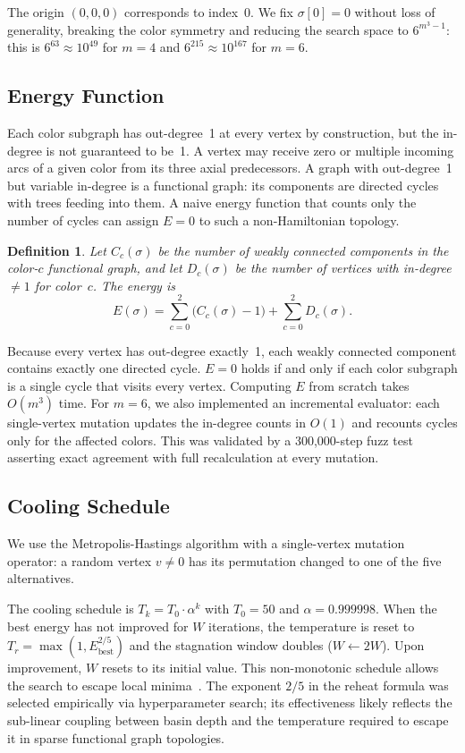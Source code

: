 \documentclass[11pt]{article}
\theoremstyle{plain}
\newtheorem{definition}{Definition}
\begin{document}
The origin $(0,0,0)$ corresponds to index~0. We fix $\sigma[0] = 0$
without loss of generality, breaking the color symmetry and reducing the
search space to $6^{m^3-1}$: this is $6^{63} \approx 10^{49}$ for
$m=4$ and $6^{215} \approx 10^{167}$ for $m=6$.

\subsection{Energy Function}

Each color subgraph has out-degree~1 at every vertex by construction, but
the in-degree is not guaranteed to be~1. A vertex may receive zero or
multiple incoming arcs of a given color from its three axial predecessors.
A graph with out-degree~1 but variable in-degree is a functional graph:
its components are directed cycles with trees feeding into them. A naive
energy function that counts only the number of cycles can assign $E = 0$
to such a non-Hamiltonian topology.

\begin{definition}
Let $C_c(\sigma)$ be the number of weakly connected components in the
color-$c$ functional graph, and let $D_c(\sigma)$ be the number of vertices
with in-degree $\ne 1$ for color~$c$. The energy is
\[
  E(\sigma) = \sum_{c=0}^{2} \bigl(C_c(\sigma) - 1\bigr)
            + \sum_{c=0}^{2} D_c(\sigma).
\]
\end{definition}

Because every vertex has out-degree exactly~1, each weakly connected
component contains exactly one directed cycle. $E = 0$ holds if and only
if each color subgraph is a single cycle that visits every vertex. Computing $E$ from scratch takes $O(m^3)$ time. For $m=6$,
we also implemented an incremental evaluator: each single-vertex mutation
updates the in-degree counts in $O(1)$ and recounts cycles only for the
affected colors. This was validated by a 300{,}000-step fuzz test asserting
exact agreement with full recalculation at every mutation.

\subsection{Cooling Schedule}

We use the Metropolis-Hastings algorithm with a single-vertex mutation
operator: a random vertex $v \ne 0$ has its permutation changed to one of
the five alternatives.

The cooling schedule is $T_k = T_0 \cdot \alpha^k$ with $T_0 = 50$ and
$\alpha = 0.999998$. When the best energy has not improved for $W$
iterations, the temperature is reset to
$T_r = \max(1, E_{\text{best}}^{2/5})$ and the stagnation window doubles
($W \leftarrow 2W$). Upon improvement, $W$ resets to its initial value.
This non-monotonic schedule allows the search to escape local
minima~\cite{kirkpatrick1983,marinari1992}.
The exponent $2/5$ in the reheat formula was selected empirically
via hyperparameter search; its effectiveness likely reflects the
sub-linear coupling between basin depth and the temperature required
to escape it in sparse functional graph topologies.
\end{document}
